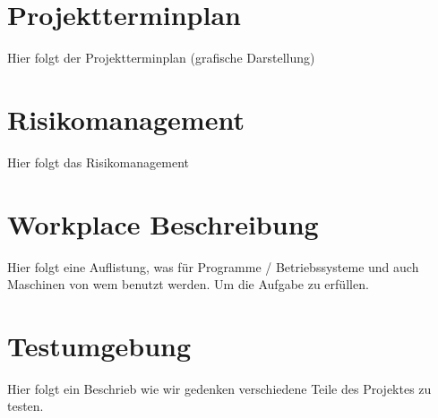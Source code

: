 \documentclass[a4paper,10pt,fleqn]{article}
\begin{document}
	\section{Projektterminplan}
	Hier folgt der Projektterminplan (grafische Darstellung)
	
	\section{Risikomanagement}
	Hier folgt das Risikomanagement
	
	\section{Workplace Beschreibung}
	Hier folgt eine Auflistung, was für Programme / Betriebssysteme und auch Maschinen von wem benutzt werden. Um die Aufgabe zu erfüllen.
	
	\section{Testumgebung}
	Hier folgt ein Beschrieb wie wir gedenken verschiedene Teile des Projektes zu testen.
	
	
\end{document}
